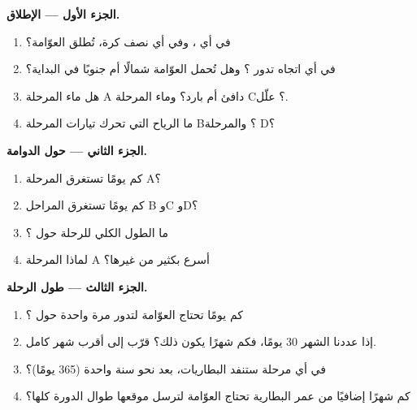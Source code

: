 \begin{problem}
\noindent\textbf{الجزء الأول --- الإطلاق.}\par\nopagebreak
\begin{enumerate}[beginpenalty=10000]
  \item في أي ، وفي أي نصف كرة، تُطلق العوّامة؟
  \item في أي اتجاه تدور ؟ وهل تُحمل العوّامة شمالًا أم جنوبًا
        في البداية؟
  \item هل ماء المرحلة A دافئ أم بارد؟ وماء المرحلة C؟ علّل.
  \item ما الرياح التي تحرك تيارات المرحلة B؟ والمرحلة D؟
\end{enumerate}

\noindent\textbf{الجزء الثاني --- حول الدوامة.}\par\nopagebreak
\begin{enumerate}[resume, beginpenalty=10000]
  \item كم يومًا تستغرق المرحلة A؟
  \item كم يومًا تستغرق المراحل B وC وD؟
  \item ما الطول الكلي للرحلة حول ؟
  \item لماذا المرحلة A أسرع بكثير من غيرها؟
\end{enumerate}

\noindent\textbf{الجزء الثالث --- طول الرحلة.}\par\nopagebreak
\begin{enumerate}[resume, beginpenalty=10000]
  \item كم يومًا تحتاج العوّامة لتدور مرة واحدة حول ؟
  \item إذا عددنا الشهر 30 يومًا، فكم شهرًا يكون ذلك؟ قرّب إلى
        أقرب شهر كامل.
  \item في أي مرحلة ستنفد البطاريات، بعد نحو سنة واحدة
        (365 يومًا)؟
  \item كم شهرًا إضافيًا من عمر البطارية تحتاج العوّامة لترسل
        موقعها طوال الدورة كلها؟
\end{enumerate}
\end{problem}
